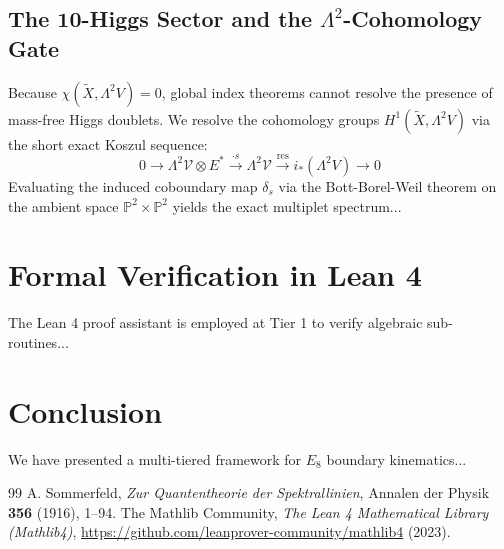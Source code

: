 \documentclass[11pt,a4paper]{article}
\theoremstyle{remark}
\begin{document}
\subsection{The $\mathbf{10}$-Higgs Sector and the $\Lambda^2$-Cohomology Gate}
Because $\chi(\widetilde{X}, \Lambda^2 V) = 0$, global index theorems cannot resolve the presence of mass-free Higgs doublets. We resolve the cohomology groups $H^1(\widetilde{X}, \Lambda^2 V)$ via the short exact Koszul sequence:
\begin{equation}
    0 \to \Lambda^2 \mathcal{V} \otimes E^* \xrightarrow{\cdot s} \Lambda^2 \mathcal{V} \xrightarrow{\text{res}} i_* (\Lambda^2 V) \to 0
\end{equation}
Evaluating the induced coboundary map $\delta_s$ via the Bott-Borel-Weil theorem on the ambient space $\mathbb{P}^2 \times \mathbb{P}^2$ yields the exact multiplet spectrum...

\section{Formal Verification in Lean 4}
The Lean 4 proof assistant is employed at Tier 1 to verify algebraic sub-routines...

\section{Conclusion}
We have presented a multi-tiered framework for $E_8$ boundary kinematics...

\begin{thebibliography}{99}
 A. Sommerfeld, \textit{Zur Quantentheorie der Spektrallinien}, Annalen der Physik \textbf{356} (1916), 1--94.
 The Mathlib Community, \textit{The Lean 4 Mathematical Library (Mathlib4)}, \url{https://github.com/leanprover-community/mathlib4} (2023).
\end{thebibliography}
\end{document}
